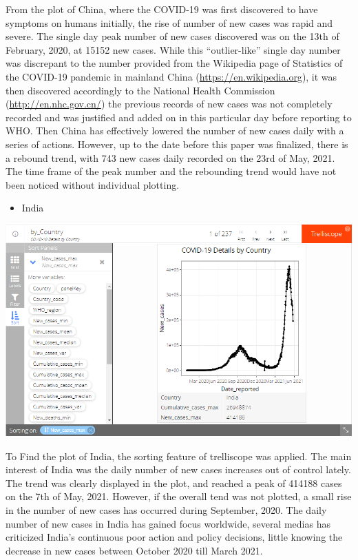 \documentclass[
]{article}
\providecommand{\tightlist}{%
  \setlength{\itemsep}{0pt}\setlength{\parskip}{0pt}}
\begin{document}
From the plot of China, where the COVID-19 was first discovered to have
symptoms on humans initially, the rise of number of new cases was rapid
and severe. The single day peak number of new cases discovered was on
the 13th of February, 2020, at 15152 new cases. While this
``outlier-like'' single day number was discrepant to the number provided
from the Wikipedia page of Statistics of the COVID-19 pandemic in
mainland China (\url{https://en.wikipedia.org}), it was then discovered
accordingly to the National Health Commission
(\url{http://en.nhc.gov.cn/}) the previous records of new cases was not
completely recorded and was justified and added on in this particular
day before reporting to WHO. Then China has effectively lowered the
number of new cases daily with a series of actions. However, up to the
date before this paper was finalized, there is a rebound trend, with 743
new cases daily recorded on the 23rd of May, 2021. The time frame of the
peak number and the rebounding trend would have not been noticed without
individual plotting.

\begin{itemize}
\tightlist
\item
  India
\end{itemize}

\includegraphics[width=1\linewidth,height=1\textheight]{India}

To Find the plot of India, the sorting feature of trelliscope was
applied. The main interest of India was the daily number of new cases
increases out of control lately. The trend was clearly displayed in the
plot, and reached a peak of 414188 cases on the 7th of May, 2021.
However, if the overall tend was not plotted, a small rise in the number
of new cases has occurred during September, 2020. The daily number of
new cases in India has gained focus worldwide, several medias has
criticized India's continuous poor action and policy decisions, little
knowing the decrease in new cases between October 2020 till March 2021.
\end{document}
